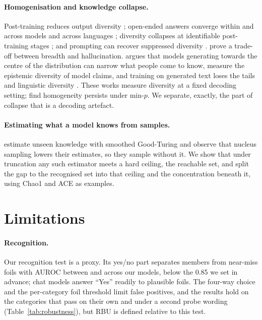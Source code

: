 \documentclass[11pt]{article}
\begin{document}
\paragraph{Homogenisation and knowledge collapse.} Post-training reduces output diversity \citep{kirk2024understanding}; open-ended answers converge within and across models \citep{jiang2025hivemind} and across languages \citep{davey2026multilingual}; diversity collapses at identifiable post-training stages \citep{karouzos2026diversity}; and prompting can recover suppressed diversity \citep{zhang2026verbalized}. \citet{kalavasis2025limits} prove a trade-off between breadth and hallucination. \citet{peterson2025collapse} argues that models generating towards the centre of the distribution can narrow what people come to know, \citet{wright2026epistemic} measure the epistemic diversity of model claims, and training on generated text loses the tails \citep{shumailov2024collapse} and linguistic diversity \citep{guo2024curious}. These works measure diversity at a fixed decoding setting; \citet{jiang2025hivemind} find homogeneity persists under min-$p$. We separate, exactly, the part of collapse that is a decoding artefact.

\paragraph{Estimating what a model knows from samples.} \citet{li2025unseen} estimate unseen knowledge with smoothed Good-Turing and observe that nucleus sampling lowers their estimates, so they sample without it. We show that under truncation any such estimator meets a hard ceiling, the reachable set, and split the gap to the recognised set into that ceiling and the concentration beneath it, using Chao1 \citep{chao1984nonparametric} and ACE \citep{chao1992coverage} as examples.

\section*{Limitations}\label{sec:limitations}

\paragraph{Recognition.} Our recognition test is a proxy. Its yes/no part separates members from near-miss foils with AUROC between \rcAurocMin{} and \rcAurocMax{} across our models, below the 0.85 we set in advance; chat models answer ``Yes'' readily to plausible foils. The four-way choice and the per-category foil threshold limit false positives, and the results hold on the categories that pass on their own and under a second probe wording (Table~\ref{tab:robustness}), but RBU is defined relative to this test. \pdAskDirectly{}
\end{document}
